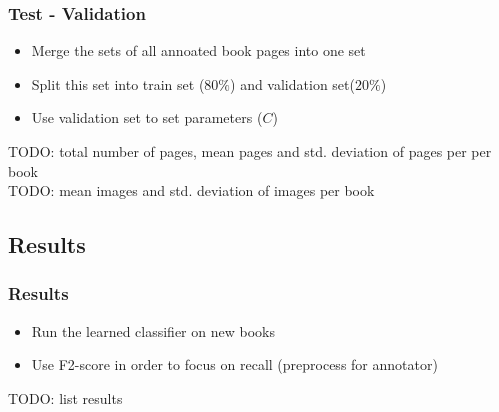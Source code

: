 \begin{frame}
\frametitle{Test - Validation}
\begin{itemize}
\item Merge the sets of all annoated book pages into one set
\item Split this set into train set ($80\%$) and validation set($20\%$)
\item Use validation set to set parameters ($C$)
\end{itemize}
TODO: total number of pages, mean pages and std. deviation of pages per per book \\
TODO: mean images and std. deviation of images per book
\end{frame}

\subsection{Results}
\begin{frame}
\frametitle{Results}
\begin{itemize}
\item Run the learned classifier on new books
\item Use F2-score in order to focus on recall (preprocess for annotator)
\end{itemize}
TODO: list results

\end{frame}
